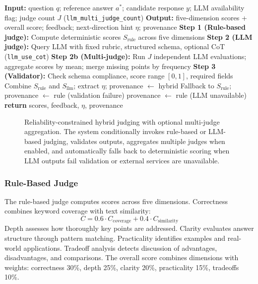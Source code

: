 ﻿\documentclass[final,3p,times,authoryear]{elsarticle}
\begin{document}
\begin{algorithm}[h]
\caption{Reliability-Constrained Hybrid Judging with Routing and Fallback}
\label{alg:rq3}
\begin{algorithmic}[1]
\STATE \textbf{Input:} question $q$; reference answer $a^*$; candidate response $y$; LLM availability flag; judge count $J$ (\texttt{llm\_multi\_judge\_count})
\STATE \textbf{Output:} five-dimension scores + overall score; feedback; next-direction hint $\eta$; provenance
\STATE \textbf{Step 1 (Rule-based judge):} Compute deterministic scores $S_{\text{rule}}$ across five dimensions
    \STATE \textbf{Step 2 (LLM judge):} Query LLM with fixed rubric, structured schema, optional CoT (\texttt{llm\_use\_cot})
        \STATE \textbf{Step 2b (Multi-judge):} Run $J$ independent LLM evaluations; aggregate scores by mean; merge missing points by frequency
    \ENDIF
    \STATE \textbf{Step 3 (Validator):} Check schema compliance, score range $[0,1]$, required fields
        \STATE Combine $S_{\text{rule}}$ and $S_{\text{llm}}$; extract $\eta$; provenance $\leftarrow$ hybrid
\ELSE
        \STATE Fallback to $S_{\text{rule}}$; provenance $\leftarrow$ rule (validation failure)
\ENDIF
\ELSE
    \STATE provenance $\leftarrow$ rule (LLM unavailable)
\ENDIF
\STATE \textbf{return} scores, feedback, $\eta$, provenance
\end{algorithmic}
\end{algorithm}

\begin{figure}[t]
\centering
\resizebox{\textwidth}{!}{}
\caption{Reliability-constrained hybrid judging with optional multi-judge aggregation. The system conditionally invokes rule-based or LLM-based judging, validates outputs, aggregates multiple judges when enabled, and automatically falls back to deterministic scoring when LLM outputs fail validation or external services are unavailable.}
\label{fig:hybrid_judging}
\end{figure}

\subsubsection{Rule-Based Judge}

\noindent The rule-based judge computes scores across five dimensions. Correctness combines keyword coverage with text similarity:
\begin{equation}
C = 0.6 \cdot C_{\text{coverage}} + 0.4 \cdot C_{\text{similarity}}
\end{equation}
Depth assesses how thoroughly key points are addressed. Clarity evaluates answer structure through pattern matching. Practicality identifies examples and real-world applications. Tradeoff analysis detects discussion of advantages, disadvantages, and comparisons. The overall score combines dimensions with weights: correctness 30\%, depth 25\%, clarity 20\%, practicality 15\%, tradeoffs 10\%.
\end{document}
